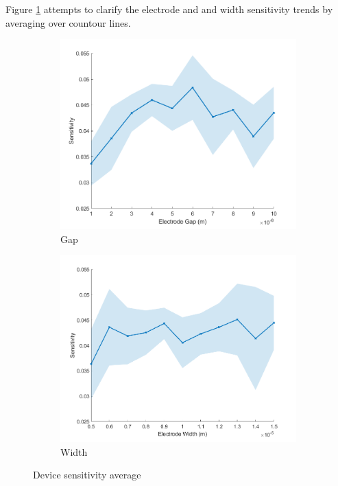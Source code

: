 \par Figure \ref{fig:device_sensitivity_average} attempts to clarify the electrode and and width sensitivity trends by averaging over countour lines.

\begin{figure}[h]
    \centering
    \begin{subfigure}[b]{0.49\textwidth}
        \centering
        \includegraphics[width=\textwidth]{images/comsol_device_gapXsensitivity_aveError.png}
        \caption{Gap}
    \end{subfigure}
    \hfill
    \begin{subfigure}[b]{0.49\textwidth}
        \centering
        \includegraphics[width=\textwidth]{images/comsol_device_widthXsensitivity_aveError.png}
        \caption{Width}
    \end{subfigure}
    \caption[Device sensitivity average]{Device sensitivity average}
    \label{fig:device_sensitivity_average}
\end{figure}


